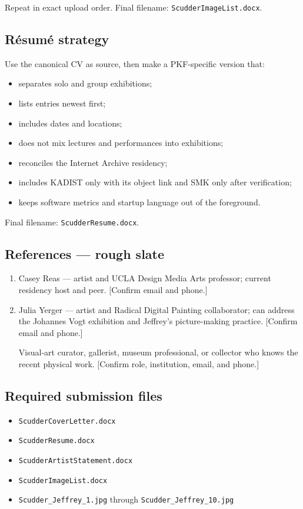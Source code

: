 \documentclass[11pt,letterpaper]{article}
\begin{document}
Repeat in exact upload order. Final filename: \texttt{ScudderImageList.docx}.

\subsection{Résumé strategy}

Use the canonical CV as source, then make a PKF-specific version that:

\begin{itemize}
\item separates solo and group exhibitions;
\item lists entries newest first;
\item includes dates and locations;
\item does not mix lectures and performances into exhibitions;
\item reconciles the Internet Archive residency;
\item includes KADIST only with its object link and SMK only after verification;
\item keeps software metrics and startup language out of the foreground.
\end{itemize}

Final filename: \texttt{ScudderResume.docx}.

\subsection{References --- rough slate}

\begin{enumerate}
\item Casey Reas --- artist and UCLA Design Media Arts professor; current residency host and peer. [Confirm email and phone.]
\item Julia Yerger --- artist and Radical Digital Painting collaborator; can address the Johannes Vogt exhibition and Jeffrey's picture-making practice. [Confirm email and phone.]
\item [Visual-art curator, gallerist, museum professional, or collector who knows the recent physical work.] [Confirm role, institution, email, and phone.]
\end{enumerate}

\subsection{Required submission files}

\begin{itemize}
\item \texttt{ScudderCoverLetter.docx}
\item \texttt{ScudderResume.docx}
\item \texttt{ScudderArtistStatement.docx}
\item \texttt{ScudderImageList.docx}
\item \texttt{Scudder\_Jeffrey\_1.jpg} through \texttt{Scudder\_Jeffrey\_10.jpg}
\end{itemize}
\end{document}
